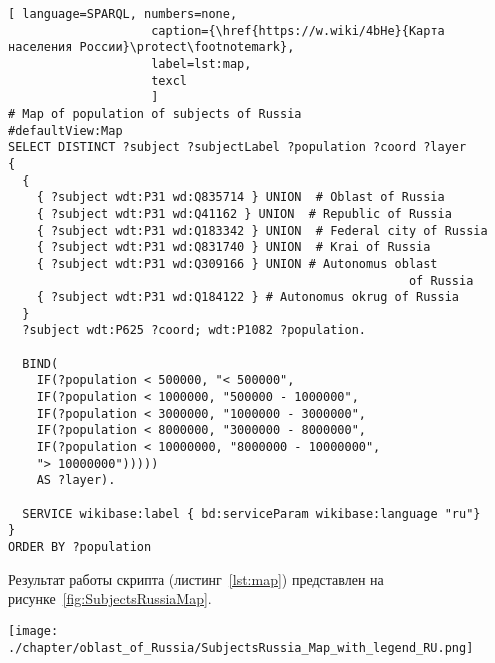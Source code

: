 \begin{lstlisting}[ language=SPARQL, numbers=none,
                    caption={\href{https://w.wiki/4bHe}{Карта населения России}\protect\footnotemark},
                    label=lst:map,
                    texcl 
                    ]
# Map of population of subjects of Russia
#defaultView:Map
SELECT DISTINCT ?subject ?subjectLabel ?population ?coord ?layer
{
  {
    { ?subject wdt:P31 wd:Q835714 } UNION  # Oblast of Russia
    { ?subject wdt:P31 wd:Q41162 } UNION  # Republic of Russia
    { ?subject wdt:P31 wd:Q183342 } UNION  # Federal city of Russia
    { ?subject wdt:P31 wd:Q831740 } UNION  # Krai of Russia
    { ?subject wdt:P31 wd:Q309166 } UNION # Autonomus oblast 
                                                        of Russia
    { ?subject wdt:P31 wd:Q184122 } # Autonomus okrug of Russia
  }   
  ?subject wdt:P625 ?coord; wdt:P1082 ?population.
  
  BIND(
    IF(?population < 500000, "< 500000",
    IF(?population < 1000000, "500000 - 1000000",
    IF(?population < 3000000, "1000000 - 3000000",
    IF(?population < 8000000, "3000000 - 8000000",
    IF(?population < 10000000, "8000000 - 10000000",
    "> 10000000")))))
    AS ?layer).
  
  SERVICE wikibase:label { bd:serviceParam wikibase:language "ru"}
}
ORDER BY ?population
\end{lstlisting}%

Результат работы скрипта (листинг~\ref{lst:map}) представлен на рисунке~\ref{fig:SubjectsRussiaMap}.

\begin{fullwidth}
\begin{figure*}[h]
	\texttt{[image: ./chapter/oblast\_of\_Russia/SubjectsRussia\_Map\_with\_legend\_RU.png]}
	\caption[Карта численности населения по субъектам России, 2021.]{Карта численности населения по субъектам России, 2021. Субъекты разделёны на шесть групп по количеству населения и отмечены разными цветами в зависимости от группы, в которую субъект входит. Карта построена на основе данных, полученных с помощью запроса~\protect\ref{lst:map}.}%
      \label{fig:SubjectsRussiaMap}%
\end{figure*} 
\end{fullwidth}

